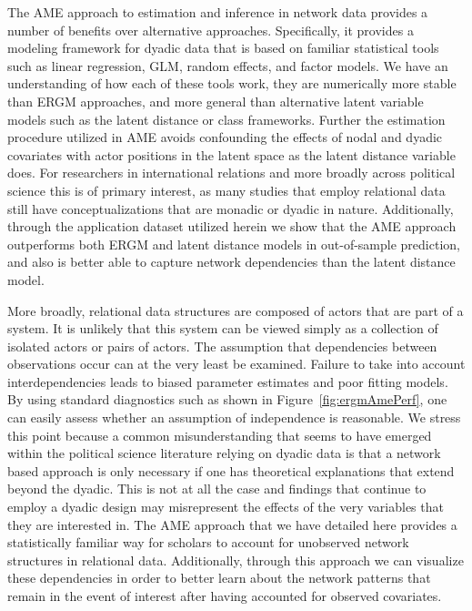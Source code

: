 \documentclass[11pt,pdflatex]{elsarticle}
\begin{document}
The AME approach to estimation and inference in network data provides a number of benefits over alternative approaches. Specifically, it provides a modeling framework for dyadic data that is based on familiar statistical tools such as linear regression, GLM, random effects, and factor models. We have an understanding of how each of these tools work, they are numerically more stable than ERGM approaches, and more general than alternative latent variable models such as the latent distance or class frameworks. Further the estimation procedure utilized in AME avoids confounding the effects of nodal and dyadic covariates with actor positions in the latent space as the latent distance variable does. For researchers in international relations and more broadly across political science this is of primary interest, as many studies that employ relational data still have conceptualizations  that are monadic or dyadic in nature. Additionally, through the application dataset utilized herein we show that the AME approach outperforms both ERGM and latent distance models in out-of-sample prediction, and also is better able to capture network dependencies than the latent distance model. 

More broadly, relational data structures are composed of actors that are part of a system. It is unlikely that this system can be viewed simply as a collection of isolated actors or pairs of actors. The assumption  that dependencies between observations occur can at the very least be examined. Failure to take into account interdependencies leads to biased parameter estimates and poor fitting models. By using standard diagnostics such as shown in Figure~\ref{fig:ergmAmePerf}, one can easily assess whether an assumption of independence is reasonable. We stress this point because a common misunderstanding that seems to have emerged within the political science literature relying on dyadic data is that a network based approach is only necessary if one has theoretical explanations that extend beyond the dyadic. This is not at all the case and findings that continue to employ a dyadic design may misrepresent the effects of the very variables that they are interested in. The AME approach that we have detailed here provides a statistically familiar way for scholars to account for unobserved network structures in relational data. Additionally, through this approach we can visualize these dependencies in order to better learn about the network patterns that remain in the event of interest after having accounted for observed covariates.  
\end{document}

